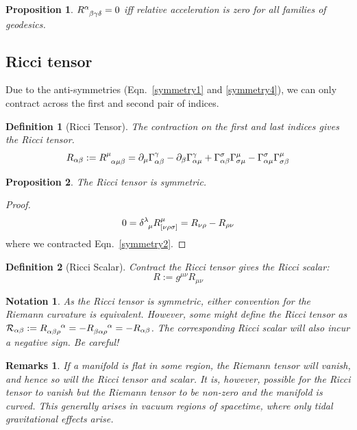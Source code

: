 \documentclass[a4paper]{article}
\newtheorem{remarks}{Remarks}[section]
\newtheorem{notation}{Notation}[section]
\theoremstyle{new}
\newtheorem{defi}{Definition}[section]
\newtheorem{prop}{Proposition}[section]
\begin{document}
\begin{prop}
$\tensor*{R}{*_{}^{\alpha}_{\beta\gamma\delta}}=0$ iff relative acceleration is zero for all families of geodesics.
\end{prop}
\subsection{Ricci tensor}
Due to the anti-symmetries (Eqn.~\ref{symmetry1} and \ref{symmetry4}), we can only contract across the first and second pair of indices.
\begin{defi}[Ricci Tensor]
The contraction on the first and last indices gives the Ricci tensor.
\begin{equation}
R_{\alpha\beta}:=\tensor*{R}{*_{}^{\mu}_{\alpha\mu\beta}}=\partial_\mu\Gamma_{\alpha\beta}^\gamma-\partial_\beta\Gamma_{\alpha\mu}^\gamma+\Gamma_{\alpha\beta}^\sigma\Gamma_{\sigma\mu}^\mu-\Gamma_{\alpha\mu}^\sigma\Gamma_{\sigma\beta}^\mu\label{RicciTensor}
\end{equation}
\end{defi}
\begin{prop}
The Ricci tensor is symmetric.
\end{prop}
\begin{proof}
$$0=\tensor*{\delta}{*_{}^{\lambda}_{\mu}}R^\mu_{[\nu\rho\sigma]}=R_{\nu\rho}-R_{\rho\nu}$$
where we contracted Eqn.~\ref{symmetry2}.
\end{proof}
\begin{defi}[Ricci Scalar]
Contract the Ricci tensor gives the Ricci scalar:
\begin{equation}
R:=g^{\mu\nu}R_{\mu\nu}\label{RicciScalar}
\end{equation}
\end{defi}
\begin{notation}
As the Ricci tensor is symmetric, either convention for the Riemann curvature is equivalent. However, some might define the Ricci tensor as $\mathcal{R}_{\alpha\beta}:=\tensor*{R}{*^{}_{\alpha\beta\rho}^{\alpha}}=-\tensor*{R}{*^{}_{\beta\alpha\rho}^{\alpha}}=-R_{\alpha\beta}$. The corresponding Ricci scalar will also incur a negative sign. Be careful!
\end{notation}
\begin{remarks}
If a manifold is flat in some region, the Riemann tensor will vanish, and hence so will the Ricci tensor and scalar. It is, however, possible for the Ricci tensor to vanish but the Riemann tensor to be non-zero and the manifold is curved. This generally arises in vacuum regions of spacetime, where only tidal gravitational effects arise.
\end{remarks}
\end{document}
